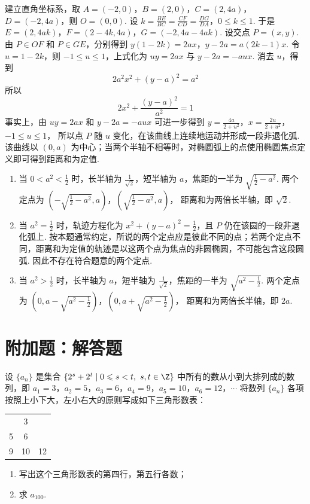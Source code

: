 \begin{solution}
建立直角坐标系，取 \(A=(-2,0)\)，\(B=(2,0)\)，\(C=(2,4a)\)，\(D=(-2,4a)\)，则 \(O=(0,0)\). 设
\(k=\frac{BE}{BC}=\frac{CF}{CD}=\frac{DG}{DA}\)，\(0\leqslant k\leqslant1\).
于是 \(E=(2,4ak)\)，\(F=(2-4k,4a)\)，\(G=(-2,4a-4ak)\). 设交点 \(P=(x,y)\). 由 \(P\in OF\) 和 \(P\in GE\)，分别得到
\(y(1-2k)=2ax\)，\(y-2a=a(2k-1)x\).
令 \(u=1-2k\)，则 \(-1\leqslant u\leqslant1\)，上式化为 \(uy=2ax\) 与 \(y-2a=-aux\). 消去 \(u\)，得到
\[
2a^2x^2+(y-a)^2=a^2
\]
所以
\[
2x^2+\frac{(y-a)^2}{a^2}=1
\]
事实上，由 \(uy=2ax\) 和 \(y-2a=-aux\) 可进一步得到
\(y=\frac{4a}{2+u^2}\)，\(x=\frac{2u}{2+u^2}\)，\(-1\leqslant u\leqslant1\)，
所以点 \(P\) 随 \(u\) 变化，在该曲线上连续地运动并形成一段非退化弧. 该曲线以 \((0,a)\) 为中心；当两个半轴不相等时，对椭圆弧上的点使用椭圆焦点定义即可得到距离和为定值.
\begin{enumerate}
\item 当 \(0<a^2<\frac12\) 时，长半轴为 \(\frac1{\sqrt2}\)，短半轴为 \(a\)，焦距的一半为 \(\sqrt{\frac12-a^2}\). 两个定点为
\(\left(-\sqrt{\frac12-a^2},a\right)\)，\(\left(\sqrt{\frac12-a^2},a\right)\)，
距离和为两倍长半轴，即 \(\sqrt2\).
\item 当 \(a^2=\frac12\) 时，轨迹方程化为 \(x^2+(y-a)^2=\frac12\)，且 \(P\) 仍在该圆的一段非退化弧上. 按本题通常约定，所说的两个定点应是彼此不同的点；若两个定点不同，距离和为定值的轨迹是以这两个点为焦点的非圆椭圆，不可能包含这段圆弧. 因此不存在符合题意的两个定点.
\item 当 \(a^2>\frac12\) 时，长半轴为 \(a\)，短半轴为 \(\frac1{\sqrt2}\)，焦距的一半为 \(\sqrt{a^2-\frac12}\). 两个定点为
\(\left(0,a-\sqrt{a^2-\frac12}\right)\)，\(\left(0,a+\sqrt{a^2-\frac12}\right)\)，
距离和为两倍长半轴，即 \(2a\).
\end{enumerate}
\end{solution}

\section{附加题：解答题}

\begin{problem}
设 \(\{a_{n}\}\) 是集合 \(\{2^{s} + 2^{t} \mid 0 \leqslant s < t,\ s, t \in \Z\}\) 中所有的数从小到大排列成的数列，即 \(a_{1} = 3\)，\(a_{2} = 5\)，\(a_{3} = 6\)，\(a_{4} = 9\)，\(a_{5} = 10\)，\(a_{6} = 12\)，\(\cdots\) 将数列 \(\{a_{n}\}\) 各项按照上小下大，左小右大的原则写成如下三角形数表：

\begin{center}
\begin{tabular}{ccc}
& 3 & \\
5 & 6 & \\
9 & 10 & 12
\end{tabular}
\end{center}

\begin{enumerate}
\item 写出这个三角形数表的第四行，第五行各数；
\item 求 \(a_{100}\).
\end{enumerate}
\end{problem}

